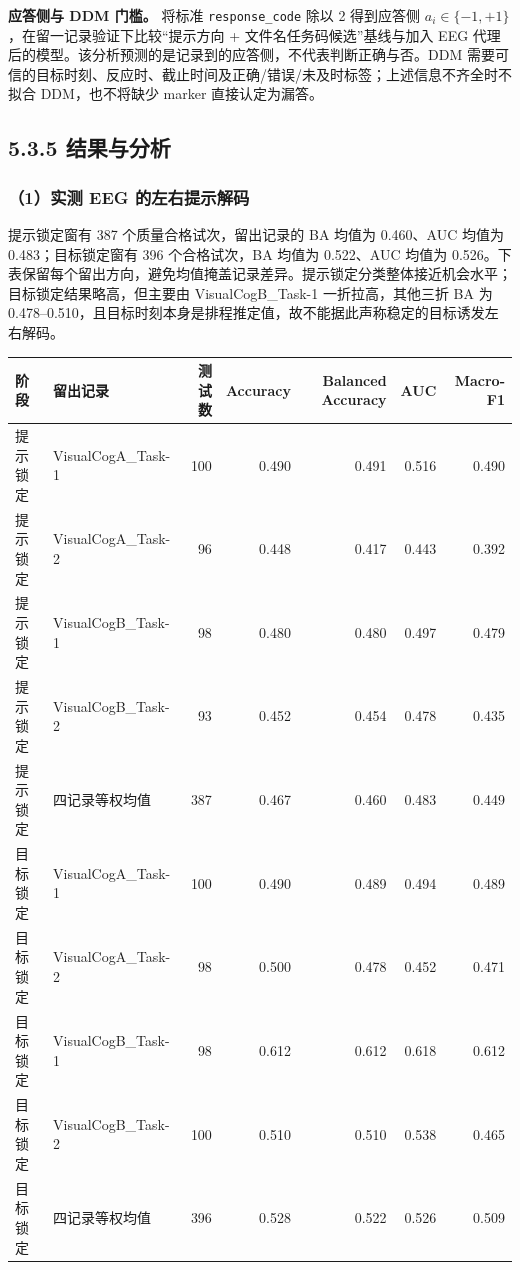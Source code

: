 \textbf{应答侧与 DDM 门槛。} 将标准 \texttt{response\_code} 除以 2
得到应答侧 \(a_i\in\{-1,+1\}\)，在留一记录验证下比较``提示方向 +
文件名任务码候选''基线与加入 EEG
代理后的模型。该分析预测的是记录到的应答侧，不代表判断正确与否。DDM
需要可信的目标时刻、反应时、截止时间及正确/错误/未及时标签；上述信息不齐全时不拟合
DDM，也不将缺少 marker 直接认定为漏答。

\hypertarget{ux7ed3ux679cux4e0eux5206ux6790}{%
\subsection{5.3.5 结果与分析}\label{ux7ed3ux679cux4e0eux5206ux6790}}

\hypertarget{ux5b9eux6d4b-eeg-ux7684ux5de6ux53f3ux63d0ux793aux89e3ux7801}{%
\subsubsection{（1）实测 EEG
的左右提示解码}\label{ux5b9eux6d4b-eeg-ux7684ux5de6ux53f3ux63d0ux793aux89e3ux7801}}

提示锁定窗有 387 个质量合格试次，留出记录的 BA 均值为 0.460、AUC 均值为
0.483；目标锁定窗有 396 个合格试次，BA 均值为 0.522、AUC 均值为
0.526。下表保留每个留出方向，避免均值掩盖记录差异。提示锁定分类整体接近机会水平；目标锁定结果略高，但主要由
VisualCogB\_Task-1 一折拉高，其他三折 BA 为
0.478--0.510，且目标时刻本身是排程推定值，故不能据此声称稳定的目标诱发左右解码。

\begin{longtable}[]{@{}llrrrrr@{}}
\toprule
阶段 & 留出记录 & 测试数 & Accuracy & Balanced Accuracy & AUC &
Macro-F1 \\
\midrule
\endhead
提示锁定 & VisualCogA\_Task-1 & 100 & 0.490 & 0.491 & 0.516 & 0.490 \\
提示锁定 & VisualCogA\_Task-2 & 96 & 0.448 & 0.417 & 0.443 & 0.392 \\
提示锁定 & VisualCogB\_Task-1 & 98 & 0.480 & 0.480 & 0.497 & 0.479 \\
提示锁定 & VisualCogB\_Task-2 & 93 & 0.452 & 0.454 & 0.478 & 0.435 \\
提示锁定 & 四记录等权均值 & 387 & 0.467 & 0.460 & 0.483 & 0.449 \\
目标锁定 & VisualCogA\_Task-1 & 100 & 0.490 & 0.489 & 0.494 & 0.489 \\
目标锁定 & VisualCogA\_Task-2 & 98 & 0.500 & 0.478 & 0.452 & 0.471 \\
目标锁定 & VisualCogB\_Task-1 & 98 & 0.612 & 0.612 & 0.618 & 0.612 \\
目标锁定 & VisualCogB\_Task-2 & 100 & 0.510 & 0.510 & 0.538 & 0.465 \\
目标锁定 & 四记录等权均值 & 396 & 0.528 & 0.522 & 0.526 & 0.509 \\
\bottomrule
\end{longtable}

